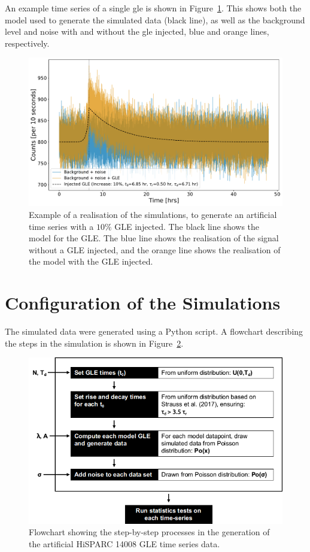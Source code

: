 An example time series of a single \gls{gle} is shown in Figure~\ref{fig:simulated_HS14008_GLE_data}. This shows both the model used to generate the simulated data (black line), as well as the background level and noise with and without the \gls{gle} injected, blue and orange lines, respectively.

\begin{figure}[ht!]
	\centering
	\includegraphics[width=\columnwidth]{simulated_HS14008_GLE_data.pdf}
	\caption{Example of a realisation of the simulations, to generate an artificial time series with a $10 \%$ GLE injected. The black line shows the model for the GLE. The blue line shows the realisation of the signal without a GLE injected, and the orange line shows the realisation of the model with the GLE injected.}
	\label{fig:simulated_HS14008_GLE_data}
\end{figure}


\section{Configuration of the Simulations}

The simulated data were generated using a Python script. A flowchart describing the steps in the simulation is shown in Figure~\ref{fig:gle_flowchart}. 

\begin{figure}[ht!]
	\centering
	\includegraphics[width=0.9\columnwidth]{GLE_sims_flowchart.png}
	\caption{Flowchart showing the step-by-step processes in the generation of the artificial HiSPARC 14008 GLE time series data.}
	\label{fig:gle_flowchart}
\end{figure}

